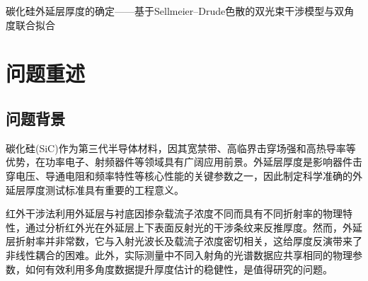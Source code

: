 \documentclass[12pt,a4paper]{ctexart}
\begin{document}
	
	\begin{center}
		{\heiti 碳化硅外延层厚度的确定——基于Sellmeier–Drude色散的双光束干涉模型与双角度联合拟合}
		\vspace{0.5cm}
	\end{center}
	
	\begin{abstract}
		碳化硅外延层厚度是衡量外延材料质量的关键参数，直接决定器件性能。本文针对红外干涉法测量外延层厚度的物理过程，建立了从光程差、Sellmeier–Drude色散到Fresnel双光束干涉的完整正演模型。问题一基于界面一次反射、透射产生的两束干涉光，推导了光程差与相位差公式，引入Sellmeier方程描述外延层折射率的波长依赖，并采用Drude模型修正载流子浓度对折射率的影响，最终给出与入射角和波数相关的非偏振理论反射率表达式。问题二在上述模型基础上，设计双角度共享参数联合非线性最小二乘算法，对同一晶圆在10$^\circ$和15$^\circ$入射角下的实测光谱进行联合拟合，得到外延层厚度为$7.40\pm0.12\ \mu\mathrm{m}$。通过拟合优度、残差分布、双角度一致性、多初值稳定性、参数相关性及波段敏感性六项指标对结果进行可靠性分析，结果表明拟合残差随机分布且无系统性条纹残余，双角度厚度差异为$3.21\%$，说明测量存在小幅系统误差，联合厚度比单角度平均更具物理一致性。本文工作为碳化硅外延层厚度的无损检测提供了一套可复现的数学框架和稳定的数值算法，并为后续多光束干涉问题的分析奠定了基础。
		
		\vspace{0.3cm}
		\noindent
		\textbf{关键词：}碳化硅外延层；红外干涉法；Sellmeier–Drude模型；双角度联合拟合；非线性最小二乘
	\end{abstract}
	\newpage
	
	\tableofcontents
	\newpage
	
	\section{问题重述}
	\subsection{问题背景}
	碳化硅(SiC)作为第三代半导体材料，因其宽禁带、高临界击穿场强和高热导率等优势，在功率电子、射频器件等领域具有广阔应用前景。外延层厚度是影响器件击穿电压、导通电阻和频率特性等核心性能的关键参数之一，因此制定科学准确的外延层厚度测试标准具有重要的工程意义。
	
	红外干涉法利用外延层与衬底因掺杂载流子浓度不同而具有不同折射率的物理特性，通过分析红外光在外延层上下表面反射光的干涉条纹来反推厚度。然而，外延层折射率并非常数，它与入射光波长及载流子浓度密切相关，这给厚度反演带来了非线性耦合的困难。此外，实际测量中不同入射角的光谱数据应共享相同的物理参数，如何有效利用多角度数据提升厚度估计的稳健性，是值得研究的问题。
	
\end{document}
